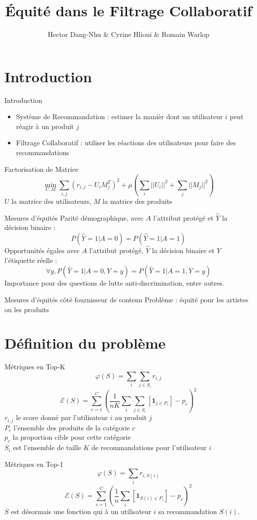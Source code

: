 \documentclass{beamer}
\title{Équité dans le Filtrage Collaboratif}
\author{Hector Dang-Nhu \& Cyrine Hlioui \& Romain Warlop}
\renewcommand{\phi}[0]{\varphi}
\begin{document}
\begin{frame}
  \maketitle
\end{frame}
\section{Introduction}
\begin{frame}{Introduction}
  \begin{itemize}
    \item Système de Recommandation : estimer la manièr dont un utilisateur $i$ peut réagir à un produit $j$
    \item Filtrage Collaboratif : utiliser les réactions des utilisateurs pour faire des recommandations
  \end{itemize}
\end{frame}
\begin{frame}{Factorisation de Matrice}
  $$\min_{U,M}\sum_{i,j} (r_{i,j} - U_iM_j^T)^2 + \mu\left(\sum_i||U_i||^2+ \sum_j||M_j||^2\right)$$
  $U$ la matrice des utilisateurs, $M$ la matrice des produits
\end{frame}

\begin{frame}{Mesures d'équités}
  Parité démographique, avec $A$ l'attribut protégé et $\hat Y$ la décision binaire :
  $$P(\hat Y = 1 | A = 0) = P(\hat Y = 1 | A = 1) $$
  Opportunités égales avec $A$ l'attribut protégé, $\hat Y$ la décision binaire et $Y$ l'étiquette réelle :
  $$\forall y, P(\hat Y = 1 | A = 0, Y = y) = P(\hat Y = 1 | A = 1, Y = y) $$
  Importance pour des questions de lutte anti-discrimination, entre autres.
\end{frame}
\begin{frame}{Mesures d'équités côté fournisseur de contenu}
  Problème : équité pour les artistes ou les produits
\end{frame}

\section{Définition du problème}
\begin{frame}{Métriques en Top-K}
$$\phi(S) = \sum_i\sum_{j\in S_i}r_{i,j}$$
$$\mathcal{E}(S) = \sum_{c=1}^C\left(\frac{1}{nK}\sum_i\sum_{j\in S_i}\left[\bm{1}_{j\in P_c}\right] - p_c\right)^2$$
$r_{i,j}$ le score donné par l'utilisateur $i$ au produit $j$\\
$P_c$ l'ensemble des produits de la catégorie $c$\\
$p_c$ la proportion cible pour cette catégorie\\
$S_i$ est l'ensemble de taille $K$ de recommandations pour l'utilisateur $i$
\end{frame}
\begin{frame}{Métriques en Top-1}
$$\phi(S) = \sum_ir_{i,S(i)}$$
  $$\mathcal{E}(S) = \sum_{c=1}^C\left(\frac{1}{n}\sum_i\left[\bm{1}_{S(i)\in P_c}\right] - p_c\right)^2$$
  $S$ est désormais une fonction qui à un utilisateur $i$ sa recommandation $S(i)$.
\end{frame}
\end{document}
